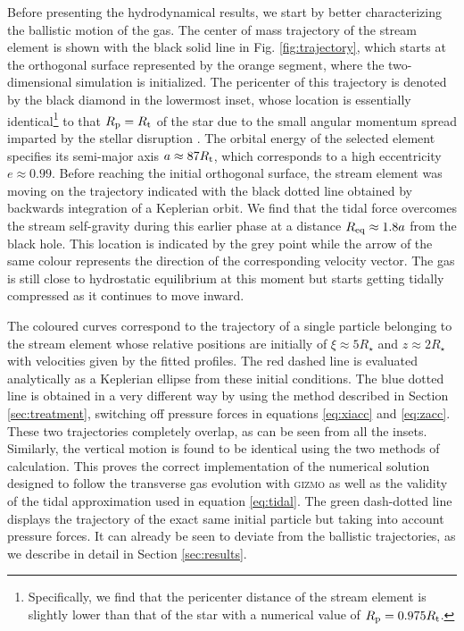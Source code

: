 \documentclass[a4paper,fleqn,usenatbib]{mnras}
\newcommand{\rstar}{R_{\star}}
\newcommand{\rp}{R_{\rm p}}
\newcommand{\rt}{R_{\rm t}}
\begin{document}
Before presenting the hydrodynamical results, we start by better characterizing the ballistic motion of the gas. The center of mass trajectory of the stream element is shown with the black solid line in Fig. \ref{fig:trajectory}, which starts at the orthogonal surface represented by the orange segment, where the two-dimensional simulation is initialized. The pericenter of this trajectory is denoted by the black diamond in the lowermost inset, whose location is essentially identical\footnote{Specifically, we find that the pericenter distance of the stream element is slightly lower than that of the star with a numerical value of $\rp = 0.975 \rt$.} to that $\rp = \rt$ of the star due to the small angular momentum spread imparted by the stellar disruption \citep{cheng2014}. The orbital energy of the selected element specifies its semi-major axis $a \approx 87 \rt$, which corresponds to a high eccentricity $e \approx  0.99$. Before reaching the initial orthogonal surface, the stream element was moving on the trajectory indicated with the black dotted line obtained by backwards integration of a Keplerian orbit. We find that the tidal force overcomes the stream self-gravity during this earlier phase at a distance $R_{\rm eq} \approx 1.8 a$ from the black hole. This location is indicated by the grey point while the arrow of the same colour represents the direction of the corresponding velocity vector. The gas is still close to hydrostatic equilibrium at this moment but starts getting tidally compressed as it continues to move inward.

The coloured curves correspond to the trajectory of a single particle belonging to the stream element whose relative positions are initially of $\xi \approx  5 \rstar$ and $z \approx  2 \rstar$ with velocities given by the fitted profiles. The red dashed line is evaluated analytically as a Keplerian ellipse from these initial conditions. The blue dotted line is obtained in a very different way by using the method described in Section \ref{sec:treatment}, switching off pressure forces in equations \eqref{eq:xiacc} and \eqref{eq:zacc}. These two trajectories completely overlap, as can be seen from all the insets. Similarly, the vertical motion is found to be identical using the two methods of calculation. This proves the correct implementation of the numerical solution designed to follow the transverse gas evolution with \textsc{gizmo} as well as the validity of the tidal approximation used in equation \eqref{eq:tidal}. The green dash-dotted line displays the trajectory of the exact same initial particle but taking into account pressure forces. It can already be seen to deviate from the ballistic trajectories, as we describe in detail in Section \ref{sec:results}.
\end{document}
